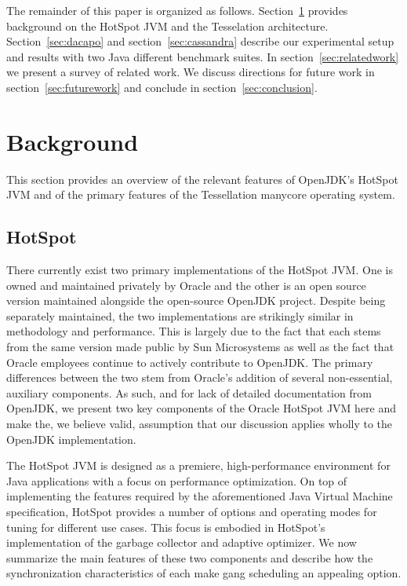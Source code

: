 \documentclass{sig-alternate}
\begin{document}
The remainder of this paper is organized as follows. Section~\ref{sec:background} provides background on the HotSpot JVM and the Tesselation architecture. Section~\ref{sec:dacapo} and section~\ref{sec:cassandra} describe our experimental setup and results with two Java different benchmark suites. In section~\ref{sec:relatedwork} we present a survey of related work. We discuss directions for future work in section~\ref{sec:futurework} and conclude in section~\ref{sec:conclusion}.

\section{Background} \label{sec:background}

This section provides an overview of the relevant features of OpenJDK's HotSpot JVM and of the primary features of the Tessellation manycore operating system.

\subsection{HotSpot}
There currently exist two primary implementations of the HotSpot JVM. One is owned and maintained privately by Oracle and the other is an open source version maintained alongside the open-source OpenJDK project. Despite being separately maintained, the two implementations are strikingly similar in methodology and performance. This is largely due to the fact that each stems from the same version made public by Sun Microsystems as well as the fact that Oracle employees continue to actively contribute to OpenJDK. The primary differences between the two stem from Oracle's addition of several non-essential, auxiliary components. As such, and for lack of detailed documentation from OpenJDK, we present two key components of the Oracle HotSpot JVM here and make the, we believe valid, assumption that our discussion applies wholly to the OpenJDK implementation.

The HotSpot JVM is designed as a premiere, high-performance environment for Java applications with a focus on performance optimization. On top of implementing the features required by the aforementioned Java Virtual Machine specification, HotSpot provides a number of options and operating modes for tuning for different use cases. This focus is embodied in HotSpot's implementation of the garbage collector and adaptive optimizer. We now summarize the main features of these two components and describe how the synchronization characteristics of each make gang scheduling an appealing option.
\end{document}
